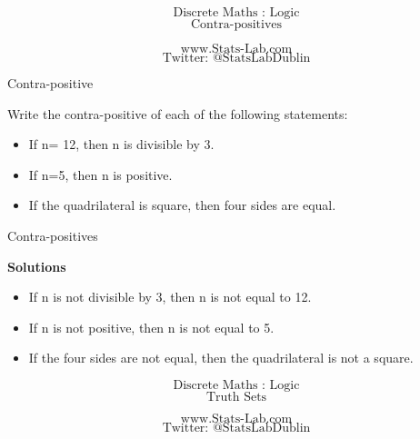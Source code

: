 \documentclass{beamer}
\begin{document}
\begin{frame}
\Huge
\[\mbox{Discrete Maths :  Logic}\]
\[\mbox{Contra-positives}\]
\bigskip

\[\mbox{www.Stats-Lab.com}\]
\[\mbox{Twitter: @StatsLabDublin}\]
\end{frame}


\begin{frame}
{Contra-positive}

Write the contra-positive of each of the following statements:

\begin{itemize}
\item If n= 12, then n is divisible by 3.
\item If n=5, then n is positive.
\item If the quadrilateral is square, then four sides are equal.
\end{itemize}
\end{frame}
\begin{frame}
{Contra-positives}

\textbf{Solutions}
\begin{itemize}
\item If n is not divisible by 3, then n is not equal to 12.
\item If n is not positive, then n is not equal to 5.
\item If the four sides are not equal, then the quadrilateral is not a square.
\end{itemize}
\end{frame}

\begin{frame}
\Huge
\[\mbox{Discrete Maths :  Logic}\]
\[\mbox{Truth Sets}\]
\bigskip

\[\mbox{www.Stats-Lab.com}\]
\[\mbox{Twitter: @StatsLabDublin}\]
\end{frame}
\end{document}
